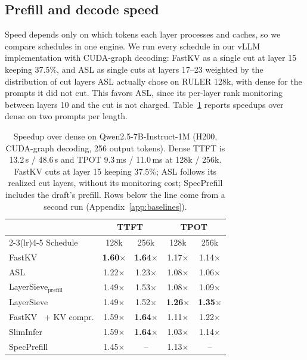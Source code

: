 \documentclass[10pt,conference]{IEEEtran}
\begin{document}
\subsection{Prefill and decode speed}
\label{sec:exp-speed}

Speed depends only on which tokens each layer processes and caches, so we compare schedules in one engine. We run every schedule in our vLLM implementation with CUDA-graph decoding: FastKV as a single cut at layer 15 keeping 37.5\%, and ASL as single cuts at layers 17--23 weighted by the distribution of cut layers ASL actually chose on RULER 128k, with dense for the prompts it did not cut. This favors ASL, since its per-layer rank monitoring between layers 10 and the cut is not charged. Table~\ref{tab:speed} reports speedups over dense on two prompts per length.

\begin{table}[t]
\centering
\caption{Speedup over dense on Qwen2.5-7B-Instruct-1M (H200, CUDA-graph decoding, 256 output tokens). Dense TTFT is 13.2\,s / 48.6\,s and TPOT 9.3\,ms / 11.0\,ms at 128k / 256k. FastKV cuts at layer 15 keeping 37.5\%; ASL follows its realized cut layers, without its monitoring cost; SpecPrefill includes the draft's prefill. Rows below the line come from a second run (Appendix~\ref{app:baselines}).}
\label{tab:speed}
\setlength{\tabcolsep}{4pt}
\small
\begin{tabular}{lcccc}
\toprule
& \multicolumn{2}{c}{TTFT} & \multicolumn{2}{c}{TPOT} \\
\cmidrule(lr){2-3}\cmidrule(lr){4-5}
Schedule & 128k & 256k & 128k & 256k \\
\midrule
FastKV~\cite{jo2026fastkv} & \textbf{1.60$\times$} & \textbf{1.64$\times$} & 1.17$\times$ & 1.14$\times$ \\
ASL~\cite{taniguchi2026asl} & 1.22$\times$ & 1.23$\times$ & 1.08$\times$ & 1.06$\times$ \\
LayerSieve$_{\text{prefill}}$ & 1.49$\times$ & 1.53$\times$ & 1.08$\times$ & 1.09$\times$ \\
LayerSieve & 1.49$\times$ & 1.52$\times$ & \textbf{1.26$\times$} & \textbf{1.35$\times$} \\
\midrule
FastKV~\cite{jo2026fastkv} + KV compr. & 1.59$\times$ & \textbf{1.64$\times$} & 1.11$\times$ & 1.22$\times$ \\
SlimInfer~\cite{long2026sliminfer} & 1.59$\times$ & \textbf{1.64$\times$} & 1.03$\times$ & 1.14$\times$ \\
SpecPrefill~\cite{liu2025specprefill} & 1.45$\times$ & -- & 1.13$\times$ & -- \\
\bottomrule
\end{tabular}
\end{table}
\end{document}
